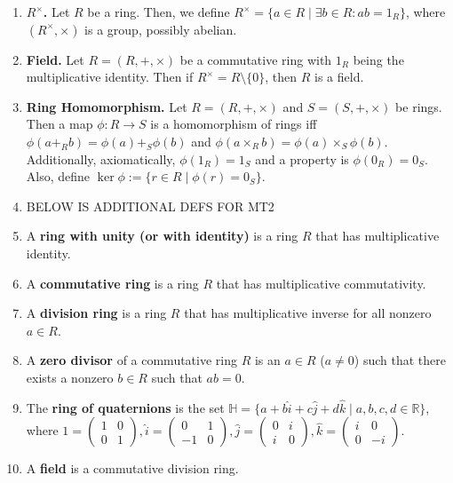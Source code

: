 \begin{enumerate}
	\item \textbf{$R^\times$. } Let $R$ be a ring. Then, we define $R^\times = \{a \in R \mid \exists b \in R : ab = 1_R\}$, where $(R^\times, \times)$ is a group, possibly abelian. 
	\item \textbf{Field. } Let $R = (R,+,\times)$ be a commutative ring with $1_R$ being the multiplicative identity. Then if $R^\times = R \setminus \{0\}$, then $R$ is a field. 
	\item \textbf{Ring Homomorphism. } Let $R = (R,+,\times)$ and $S=(S,+,\times)$ be rings. Then a map $\phi: R \to S$ is a homomorphism of rings iff $\phi(a +_R b) = \phi(a) +_S \phi(b)$ and $\phi(a \times_R b) = \phi(a) \times_S \phi(b)$. Additionally, axiomatically, $\phi(1_R)=1_S$ and a property is $\phi(0_R) = 0_S$. Also, define $\ker\phi := \{r \in R \mid \phi(r) = 0_S\}$. 
	\item BELOW IS ADDITIONAL DEFS FOR MT2
	\item A \textbf{ring with unity (or with identity)} is a ring $R$ that has multiplicative identity. 
        \item A \textbf{commutative ring} is a ring $R$ that has multiplicative commutativity. 
        \item A \textbf{division ring} is a ring $R$ that has multiplicative inverse for all nonzero $a \in R$. 
        \item A \textbf{zero divisor} of a commutative ring $R$ is an $a \in R$ ($a \neq 0$) such that there exists a nonzero $b \in R$ such that $ab=0$. 
        \item The \textbf{ring of quaternions} is the set $\mathbb{H} = \{a + b\hat{i} + c\hat{j} + d\hat{k} \mid a,b,c,d \in \mathbb{R}\}$, where $1 = \begin{pmatrix}
            1 & 0 \\
            0 & 1
        \end{pmatrix}, \hat{i} = \begin{pmatrix}
            0 & 1 \\
            -1 & 0
        \end{pmatrix}, \hat{j} = \begin{pmatrix}
            0 & i \\
            i & 0
        \end{pmatrix}, \hat{k} = \begin{pmatrix}
            i & 0 \\
            0 & -i
        \end{pmatrix}.$
	\item A \textbf{field} is a commutative division ring. 

\end{enumerate}
